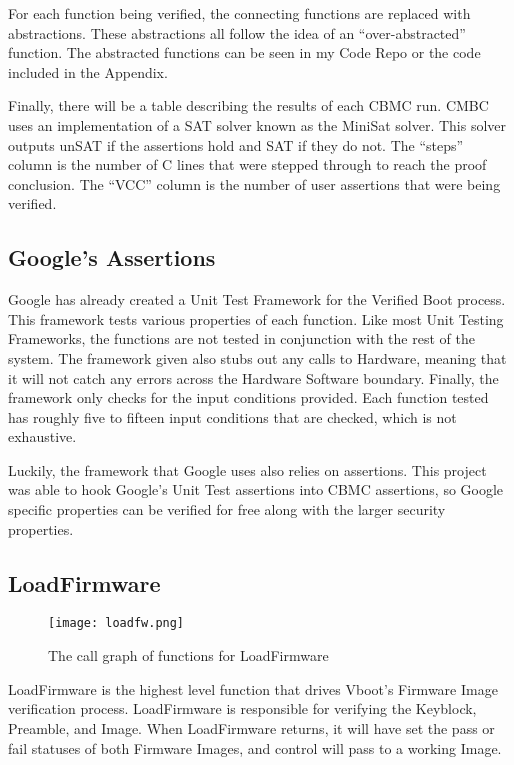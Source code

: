 For each function being verified, the connecting functions are replaced with
abstractions.
These abstractions all follow the idea of an ``over-abstracted'' function.
The abstracted functions can be seen in my Code Repo or the code included in the
Appendix.

Finally, there will be a table describing the results of each CBMC run.
CMBC uses an implementation of a SAT solver known as the MiniSat solver\cite{minisat}.
This solver outputs unSAT if the assertions hold and SAT if they do not. 
The ``steps'' column is the number of C lines that were stepped through to reach the proof conclusion.
The ``VCC'' column is the number of user assertions that were being verified.

\subsection{Google's Assertions}

Google has already created a Unit Test Framework for the Verified Boot process.
This framework tests various properties of each function.
Like most Unit Testing Frameworks, the functions are not tested in conjunction
with the rest of the system.
The framework given also stubs out any calls to Hardware, meaning that it 
will not catch any errors across the Hardware Software boundary.
Finally, the framework only checks for the input conditions provided. 
Each function tested has roughly five to fifteen input conditions that are
checked, which is not exhaustive.

Luckily, the framework that Google uses also relies on assertions.
This project was able to hook Google's Unit Test assertions into CBMC
assertions, so Google specific properties can be verified for free along with 
the larger security properties. 

\subsection{LoadFirmware}

\begin{figure}[!htbp]
  \centering
  \texttt{[image: loadfw.png]}
  \caption[LoadFirmware Call Graph]{The call graph of functions for LoadFirmware}\label{fig:loadfw}
\end{figure}

LoadFirmware is the highest level function that drives Vboot's Firmware Image
verification process.
LoadFirmware is responsible for verifying the Keyblock, Preamble, and Image.
When LoadFirmware returns, it will have set the pass or fail statuses of both Firmware Images, and control will pass to a working Image.

